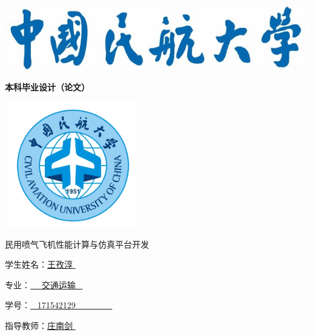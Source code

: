 \documentclass[a4paper,punct,space,heading=true,AutoFakeBold]{ctexrep}
\begin{document}
\begin{titlepage}
\setlength{\headsep}{1.3cm}
{

          \begin{center}
          \includegraphics[]{./pic/pic1.jpg}
          \end{center}
}
          \vspace{-12mm}
        \begin{center}\setlength{\baselineskip}{0pt}\bfseries\lishu{} 本科毕业设计（论文）\end{center}

        \vspace{-3.8mm}
          \begin{center}
          \includegraphics[height=5.45cm,width=5.9cm]{./pic/pic2.png}
          \end{center}
        \vspace{-1pt}
        \begin{center}\heiti{}民用喷气飞机性能计算与仿真平台开发\end{center}
        \vspace{8ex}

\begin{center}
\songti
{}
\bfseries

\setlength{\baselineskip}{32pt} %

学生姓名：{\underline{\qquad\quad 王孜淳 \qquad\quad}}~~~~~%

专\qquad 业：{\underline{\qquad~~ 交通运输 \quad\quad~}}~~~~

学\qquad 号：{\underline{\qquad~ 171542129 ~~~~~~~~}}~~~

指导教师：{\underline{\qquad\quad 庄南剑 \qquad\quad}}~~~


\end{center}
\end{titlepage}
\end{document}
